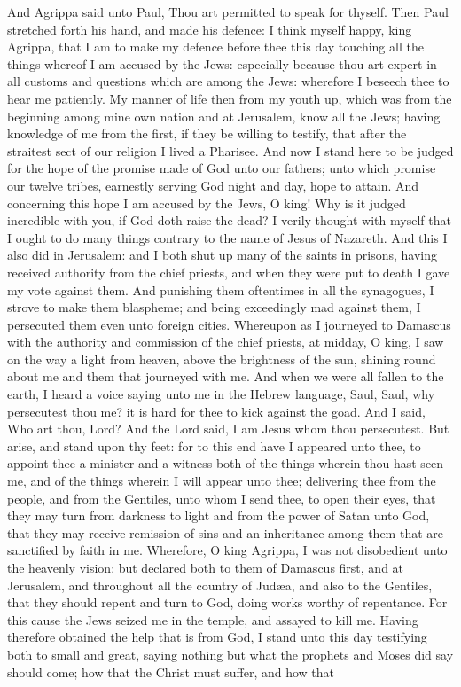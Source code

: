 And Agrippa said unto Paul, Thou art permitted to speak for thyself. Then Paul stretched forth his hand, and made his defence:  I think myself happy, king Agrippa, that I am to make my defence before thee this day touching all the things whereof I am accused by the Jews: especially because thou art expert in all customs and questions which are among the Jews: wherefore I beseech thee to hear me patiently. My manner of life then from my youth up, which was from the beginning among mine own nation and at Jerusalem, know all the Jews; having knowledge of me from the first, if they be willing to testify, that after the straitest sect of our religion I lived a Pharisee. And now I stand here to be judged for the hope of the promise made of God unto our fathers; unto which promise our twelve tribes, earnestly serving God night and day, hope to attain. And concerning this hope I am accused by the Jews, O king! Why is it judged incredible with you, if God doth raise the dead? I verily thought with myself that I ought to do many things contrary to the name of Jesus of Nazareth. And this I also did in Jerusalem: and I both shut up many of the saints in prisons, having received authority from the chief priests, and when they were put to death I gave my vote against them. And punishing them oftentimes in all the synagogues, I strove to make them blaspheme; and being exceedingly mad against them, I persecuted them even unto foreign cities. Whereupon as I journeyed to Damascus with the authority and commission of the chief priests, at midday, O king, I saw on the way a light from heaven, above the brightness of the sun, shining round about me and them that journeyed with me. And when we were all fallen to the earth, I heard a voice saying unto me in the Hebrew language, Saul, Saul, why persecutest thou me? it is hard for thee to kick against the goad. And I said, Who art thou, Lord? And the Lord said, I am Jesus whom thou persecutest. But arise, and stand upon thy feet: for to this end have I appeared unto thee, to appoint thee a minister and a witness both of the things wherein thou hast seen me, and of the things wherein I will appear unto thee; delivering thee from the people, and from the Gentiles, unto whom I send thee, to open their eyes, that they may turn from darkness to light and from the power of Satan unto God, that they may receive remission of sins and an inheritance among them that are sanctified by faith in me. Wherefore, O king Agrippa, I was not disobedient unto the heavenly vision: but declared both to them of Damascus first, and at Jerusalem, and throughout all the country of Judæa, and also to the Gentiles, that they should repent and turn to God, doing works worthy of repentance. For this cause the Jews seized me in the temple, and assayed to kill me. Having therefore obtained the help that is from God, I stand unto this day testifying both to small and great, saying nothing but what the prophets and Moses did say should come; how that the Christ must suffer, and how that 